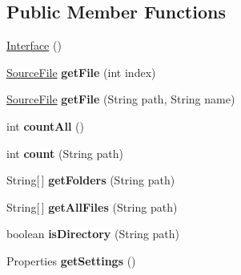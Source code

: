 \subsection*{Public Member Functions}
\begin{DoxyCompactItemize}
\item 
\hyperlink{classvideo_1_1_interface_aea74e2d2b9e8208423d7c10fefdac4d8}{Interface} ()
\item 
\hypertarget{classvideo_1_1_interface_a10f061a3cf60035457b0b6a219ce382d}{
\hyperlink{classvideo_1_1_source_file}{SourceFile} {\bfseries getFile} (int index)}
\label{classvideo_1_1_interface_a10f061a3cf60035457b0b6a219ce382d}

\item 
\hypertarget{classvideo_1_1_interface_aa8207229c73685428aa9d722aefd391a}{
\hyperlink{classvideo_1_1_source_file}{SourceFile} {\bfseries getFile} (String path, String name)}
\label{classvideo_1_1_interface_aa8207229c73685428aa9d722aefd391a}

\item 
\hypertarget{classvideo_1_1_interface_a81ead034c3afe036f69f2a9526561fa4}{
int {\bfseries countAll} ()}
\label{classvideo_1_1_interface_a81ead034c3afe036f69f2a9526561fa4}

\item 
\hypertarget{classvideo_1_1_interface_a0de7852086ec949c5b6cae0cc654e75b}{
int {\bfseries count} (String path)}
\label{classvideo_1_1_interface_a0de7852086ec949c5b6cae0cc654e75b}

\item 
\hypertarget{classvideo_1_1_interface_a50c388b22ac212eeee14e1db4fc30b13}{
String\mbox{[}$\,$\mbox{]} {\bfseries getFolders} (String path)}
\label{classvideo_1_1_interface_a50c388b22ac212eeee14e1db4fc30b13}

\item 
\hypertarget{classvideo_1_1_interface_a8f8f278f99232576c6ddde7f6860d107}{
String\mbox{[}$\,$\mbox{]} {\bfseries getAllFiles} (String path)}
\label{classvideo_1_1_interface_a8f8f278f99232576c6ddde7f6860d107}

\item 
\hypertarget{classvideo_1_1_interface_a4e8c904108a8b9adbb0f0cf9740f1931}{
boolean {\bfseries isDirectory} (String path)}
\label{classvideo_1_1_interface_a4e8c904108a8b9adbb0f0cf9740f1931}

\item 
\hypertarget{classvideo_1_1_interface_aad6a4f6a1d0f6a77aa3f4adec5d947ad}{
Properties {\bfseries getSettings} ()}
\label{classvideo_1_1_interface_aad6a4f6a1d0f6a77aa3f4adec5d947ad}

\end{DoxyCompactItemize}
